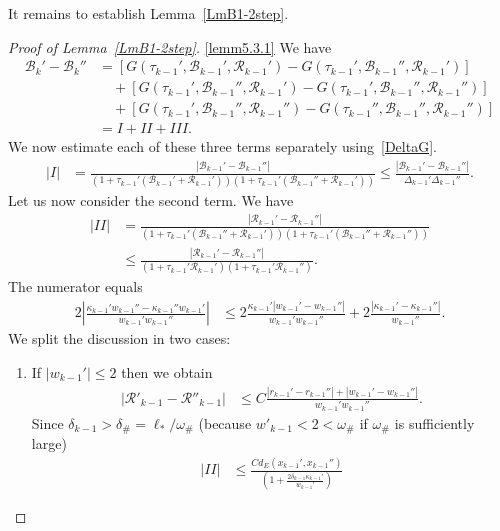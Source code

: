 \documentclass[10pt]{amsart}
\theoremstyle{definition}\newtheorem{defi}[theo]{Definition}\newtheorem{rema}[theo]{Remark}\newtheorem{exam}[theo]{Example}\newtheorem{exem}[theo]{Example}\newtheorem{nota}[theo]{Notation}
\newcommand{\ct}{r}
\newcommand{\curv}{\kappa}
\newcommand{\cB}{\mathcal{B}}
\newcommand{\cR}{\mathcal{R}}
\newcommand{\cpar}{\mathcal{R}}
\newcommand{\privatel}[1]{#1_*}
\newcommand{\elll}{\privatel{\ell}}
\newcommand{\law}[1]{\omega_{#1}}
\newcommand{\lawc}{\law{\#}}
\newcommand*\RmIII{{{I\!\!I\!\!I}}}
\newcommand*\RmII{{{I\!\!I}}}
\newcommand*{\relabel}{\renewcommand{\labelenumi}{(\theenumi)}}
\newcommand*{\Alphenumi}{\renewcommand*{\theenumi}{\Alph{enumi}}\relabel}
\begin{document}
It remains to establish Lemma~\ref{LmB1-2step}.
\begin{proof}[Proof of Lemma~\ref{LmB1-2step}]
\noindent\eqref{lemm5.3.1} We have
\begin{align*}
\cB_k'-\cB_k''&= \left[G\left(\tau_{k-1}', \cB_{k-1}', \cpar_{k-1}'\right)- G\left(\tau_{k-1}', \cB_{k-1}'', \cpar_{k-1}'\right)\right]\\
&\quad +\left[G\left(\tau_{k-1}', \cB_{k-1}'', \cpar_{k-1}'\right)- G\left(\tau_{k-1}', \cB_{k-1}'', \cpar_{k-1}''\right)\right]\\
&\quad +\left[G\left(\tau_{k-1}', \cB_{k-1}'', \cpar_{k-1}''\right)- G\left(\tau_{k-1}'', \cB_{k-1}'', \cpar_{k-1}''\right)\right]\\
&=I+\RmII+\RmIII.
\end{align*}
We now estimate each of these three terms separately using~\eqref{DeltaG}.
\begin{align*}
|I| &= \frac{ |\cB_{k-1}'-\cB_{k-1}''|}{\left(1+\tau_{k-1}'(\cB_{k-1}'+\cpar_{k-1}')\right)\left(1+\tau_{k-1}'(\cB_{k-1}''+\cpar_{k-1}')\right)}
\leq \frac{ |\cB_{k-1}'-\cB_{k-1}''|}{\Delta_{k-1}' \Delta_{k-1}''}.
\end{align*}
Let us now consider the second term. We have
\begin{align*}
|\RmII| &= \frac{ |\cpar_{k-1}'-\cpar_{k-1}''|} {\left(1+\tau_{k-1}'(\cB_{k-1}''+\cpar_{k-1}')\right)\left(1+\tau_{k-1}'(\cB_{k-1}''+\cpar_{k-1}'')\right)} \\
&\leq \frac{ |\cpar_{k-1}'-\cpar_{k-1}''|} {(1+\tau_{k-1}'\cpar_{k-1}')(1+\tau_{k-1}'\cpar_{k-1}'')}.
\end{align*}
The numerator equals
\begin{align*}
2\left|\frac{\curv_{k-1}' w_{k-1}''-\curv_{k-1}''w_{k-1}'}{w_{k-1}' w_{k-1}''}\right| &\leq 2\frac{\curv_{k-1}'|w_{k-1}'-w_{k-1}''|}{w_{k-1}' w_{k-1}''}+ 2\frac{|\curv_{k-1}'-\curv_{k-1}''|}{w_{k-1}''}.
\end{align*}
We split the discussion in two cases:
\begin{enumerate}\Alphenumi
\item\label{A} If $|w_{k-1}'|\leq 2$ then we obtain
\begin{align*}
|\cR'_{k-1}-\cR''_{k-1}| &\leq C \frac{|\ct_{k-1}'-\ct_{k-1}''|+|w_{k-1}'-w_{k-1}''|}{w_{k-1}' w_{k-1}''}.
\end{align*}
Since $\delta_{k-1} > \delta_{\#} = \elll/\lawc$ (because $w'_{k-1} < 2 < \lawc$ if $\lawc$ is sufficiently large)
\begin{align*}
|\RmII| &\leq \frac{C d_E(x_{k-1}', x_{k-1}'')} {\left(1+\frac{2\delta_{k-1} \curv_{k-1}'}{w_{k-1}'}\right)
}
\end{align*}
\end{enumerate}
\end{proof}
\end{document}
